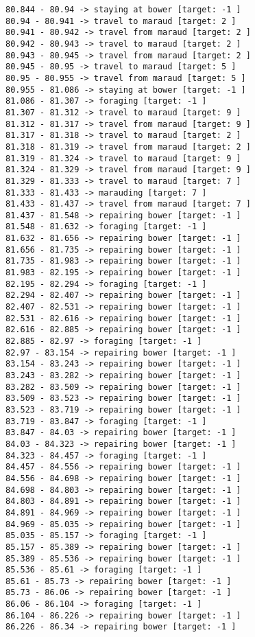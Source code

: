 \documentclass[11pt]{article}
\begin{document}
\begin{Verbatim}[commandchars=\\\{\}]
80.844 - 80.94 -> staying at bower [target: -1 ]
80.94 - 80.941 -> travel to maraud [target: 2 ]
80.941 - 80.942 -> travel from maraud [target: 2 ]
80.942 - 80.943 -> travel to maraud [target: 2 ]
80.943 - 80.945 -> travel from maraud [target: 2 ]
80.945 - 80.95 -> travel to maraud [target: 5 ]
80.95 - 80.955 -> travel from maraud [target: 5 ]
80.955 - 81.086 -> staying at bower [target: -1 ]
81.086 - 81.307 -> foraging [target: -1 ]
81.307 - 81.312 -> travel to maraud [target: 9 ]
81.312 - 81.317 -> travel from maraud [target: 9 ]
81.317 - 81.318 -> travel to maraud [target: 2 ]
81.318 - 81.319 -> travel from maraud [target: 2 ]
81.319 - 81.324 -> travel to maraud [target: 9 ]
81.324 - 81.329 -> travel from maraud [target: 9 ]
81.329 - 81.333 -> travel to maraud [target: 7 ]
81.333 - 81.433 -> marauding [target: 7 ]
81.433 - 81.437 -> travel from maraud [target: 7 ]
81.437 - 81.548 -> repairing bower [target: -1 ]
81.548 - 81.632 -> foraging [target: -1 ]
81.632 - 81.656 -> repairing bower [target: -1 ]
81.656 - 81.735 -> repairing bower [target: -1 ]
81.735 - 81.983 -> repairing bower [target: -1 ]
81.983 - 82.195 -> repairing bower [target: -1 ]
82.195 - 82.294 -> foraging [target: -1 ]
82.294 - 82.407 -> repairing bower [target: -1 ]
82.407 - 82.531 -> repairing bower [target: -1 ]
82.531 - 82.616 -> repairing bower [target: -1 ]
82.616 - 82.885 -> repairing bower [target: -1 ]
82.885 - 82.97 -> foraging [target: -1 ]
82.97 - 83.154 -> repairing bower [target: -1 ]
83.154 - 83.243 -> repairing bower [target: -1 ]
83.243 - 83.282 -> repairing bower [target: -1 ]
83.282 - 83.509 -> repairing bower [target: -1 ]
83.509 - 83.523 -> repairing bower [target: -1 ]
83.523 - 83.719 -> repairing bower [target: -1 ]
83.719 - 83.847 -> foraging [target: -1 ]
83.847 - 84.03 -> repairing bower [target: -1 ]
84.03 - 84.323 -> repairing bower [target: -1 ]
84.323 - 84.457 -> foraging [target: -1 ]
84.457 - 84.556 -> repairing bower [target: -1 ]
84.556 - 84.698 -> repairing bower [target: -1 ]
84.698 - 84.803 -> repairing bower [target: -1 ]
84.803 - 84.891 -> repairing bower [target: -1 ]
84.891 - 84.969 -> repairing bower [target: -1 ]
84.969 - 85.035 -> repairing bower [target: -1 ]
85.035 - 85.157 -> foraging [target: -1 ]
85.157 - 85.389 -> repairing bower [target: -1 ]
85.389 - 85.536 -> repairing bower [target: -1 ]
85.536 - 85.61 -> foraging [target: -1 ]
85.61 - 85.73 -> repairing bower [target: -1 ]
85.73 - 86.06 -> repairing bower [target: -1 ]
86.06 - 86.104 -> foraging [target: -1 ]
86.104 - 86.226 -> repairing bower [target: -1 ]
86.226 - 86.34 -> repairing bower [target: -1 ]

\end{Verbatim}
\end{document}
